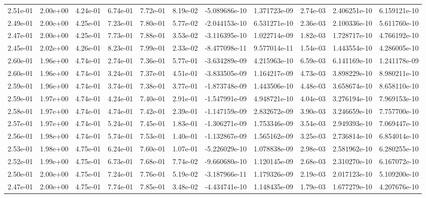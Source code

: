 \begin{longtable}{| p{} | p{} |}
2.51e-01 & 2.00e+00 & 4.24e-01 & 6.74e-01 & 7.72e-01 & 8.19e-02 & -5.089686e-10 &  1.371723e-09 &  2.74e-03 &  2.406251e-10 &  6.159121e-10 \\
2.49e-01 & 2.00e+00 & 4.25e-01 & 7.23e-01 & 7.80e-01 & 5.77e-02 & -2.044153e-10 &  6.531271e-10 &  2.36e-03 &  2.100336e-10 &  5.611760e-10 \\
2.47e-01 & 2.00e+00 & 4.25e-01 & 7.73e-01 & 7.88e-01 & 3.53e-02 & -3.116395e-10 &  1.022714e-09 &  1.82e-03 &  1.728717e-10 &  4.766192e-10 \\
2.45e-01 & 2.02e+00 & 4.26e-01 & 8.23e-01 & 7.99e-01 & 2.33e-02 & -8.477098e-11 &  9.577014e-11 &  1.54e-03 &  1.443554e-10 &  4.286005e-10 \\
2.60e-01 & 1.96e+00 & 4.74e-01 & 2.74e-01 & 7.36e-01 & 5.77e-01 & -3.634289e-09 &  4.215963e-10 &  6.59e-03 &  6.141169e-10 &  1.241178e-09 \\
2.60e-01 & 1.96e+00 & 4.74e-01 & 3.24e-01 & 7.37e-01 & 4.51e-01 & -3.833505e-09 &  1.164217e-09 &  4.73e-03 &  3.898229e-10 &  8.980211e-10 \\
2.59e-01 & 1.96e+00 & 4.74e-01 & 3.74e-01 & 7.38e-01 & 3.77e-01 & -1.873748e-09 &  1.443506e-10 &  4.48e-03 &  3.658674e-10 &  8.658110e-10 \\
2.59e-01 & 1.97e+00 & 4.74e-01 & 4.24e-01 & 7.40e-01 & 2.91e-01 & -1.547991e-09 &  4.948721e-10 &  4.04e-03 &  3.276194e-10 &  7.969153e-10 \\
2.58e-01 & 1.97e+00 & 4.74e-01 & 4.74e-01 & 7.42e-01 & 2.39e-01 & -1.147159e-09 &  2.832672e-09 &  3.90e-03 &  3.246659e-10 &  7.757700e-10 \\
2.57e-01 & 1.97e+00 & 4.74e-01 & 5.24e-01 & 7.45e-01 & 1.83e-01 & -1.306271e-09 &  1.753346e-09 &  3.54e-03 &  2.949393e-10 &  7.069447e-10 \\
2.56e-01 & 1.98e+00 & 4.74e-01 & 5.74e-01 & 7.53e-01 & 1.40e-01 & -1.132867e-09 &  1.565162e-09 &  3.25e-03 &  2.736814e-10 &  6.854014e-10 \\
2.53e-01 & 1.98e+00 & 4.75e-01 & 6.24e-01 & 7.60e-01 & 1.07e-01 & -5.226029e-10 &  1.078838e-09 &  2.98e-03 &  2.581962e-10 &  6.280255e-10 \\
2.52e-01 & 1.99e+00 & 4.75e-01 & 6.73e-01 & 7.68e-01 & 7.74e-02 & -9.660680e-10 &  1.120145e-09 &  2.68e-03 &  2.310270e-10 &  6.167072e-10 \\
2.50e-01 & 2.00e+00 & 4.75e-01 & 7.24e-01 & 7.76e-01 & 5.19e-02 & -3.187966e-11 &  1.179326e-09 &  2.19e-03 &  2.017123e-10 &  5.109200e-10 \\
2.47e-01 & 2.00e+00 & 4.75e-01 & 7.74e-01 & 7.85e-01 & 3.48e-02 & -4.434741e-10 &  1.148435e-09 &  1.79e-03 &  1.677279e-10 &  4.207676e-10 \\

\end{longtable}
